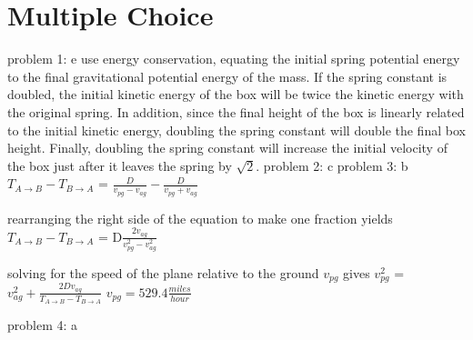 \chapter{Multiple Choice}
\label{Multiple Choice}
problem 1: e 
\newline
use energy conservation, equating the initial spring potential energy to the final gravitational\newline
potential energy of the mass. If the spring constant is doubled, the initial kinetic energy of\newline
the box will be twice the kinetic energy with the original spring. In addition, since the final\newline
height of the box is linearly related to the initial kinetic energy, doubling the spring constant\newline
will double the final box height. Finally, doubling the spring constant will increase the initial\newline
velocity of the box just after it leaves the spring by $\sqrt{2}$.\newline
problem 2: c
\newline
problem 3: b
\newline
$T_{A \rightarrow B} - T_{B \rightarrow A}$ = $\frac{D}{v_{pg} - v_{ag}} - \frac{D}{v_{pg} + v_{ag}}$\newline
                                                                   
rearranging the right side of the equation to make one fraction yields\newline
$T_{A \rightarrow B} - T_{B \rightarrow A}$ = D$\frac{2v_{ag}}{v_{pg}^{2} - v_{ag}^{2}}$\newline
                                                                 
solving for the speed of the plane relative to the ground $v_{pg}$ gives\newline
$v_{pg}^{2}$ = $v_{ag}^{2} + \frac{2Dv_{ag}}{T_{A \rightarrow B} - T_{B \rightarrow A}}$\newline
$v_{pg} = 529.4 \frac{miles}{hour}$\newline

problem 4: a\newline
                                                     
